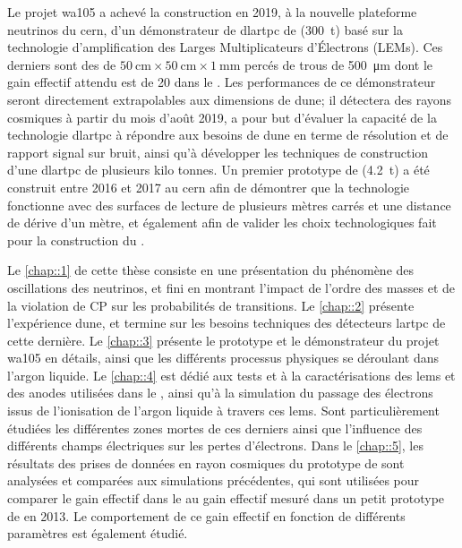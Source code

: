 Le projet \acrshort{wa105} a achevé la construction en 2019, à la nouvelle plateforme neutrinos du \acrshort{cern}, d'un démonstrateur de \gls{dlartpc} de \SSS{} (\SI{300}{\tonne}) basé sur la technologie d'amplification des Larges Multiplicateurs d’Électrons (LEMs). Ces derniers sont des  de $\SI{50}{\centi\meter}\times\SI{50}{\centi\meter}\times\SI{1}{\milli\meter}$ percés de trous de \SI{500}{\micro\meter} dont le gain effectif attendu est de 20 dans le \SSS{}. Les performances de ce démonstrateur seront directement extrapolables aux dimensions de \acrshort{dune}; il détectera des rayons cosmiques à partir du mois d'août 2019, a pour but d'évaluer la capacité de la technologie \gls{dlartpc} à répondre aux besoins de \acrshort{dune} en terme de résolution et de rapport signal sur bruit, ainsi qu'à développer les techniques de construction d'une \gls{dlartpc} de plusieurs kilo tonnes. Un premier prototype de \TOO{} (\SI{4.2}{\tonne}) a été construit entre 2016 et 2017 au \acrshort{cern} afin de démontrer que la technologie fonctionne avec des surfaces de lecture de plusieurs mètres carrés et une distance de dérive d'un mètre, et également afin de valider les choix technologiques fait pour la construction du \SSS{}.

Le \autoref{chap::1} de cette thèse consiste en une présentation du phénomène des oscillations des neutrinos, et fini en montrant l'impact de l'ordre des masses et de la violation de CP sur les probabilités de transitions. Le \autoref{chap::2} présente l'expérience \acrshort{dune}, et termine sur les besoins techniques des détecteurs \gls{lartpc} de cette dernière. Le \autoref{chap::3} présente le prototype et le démonstrateur du projet \acrshort{wa105} en détails, ainsi que les différents processus physiques se déroulant dans l'argon liquide. Le \autoref{chap::4} est dédié aux tests et à la caractérisations des \glspl{lem} et des anodes utilisées dans le \SSS{}, ainsi qu'à la simulation du passage des électrons issus de l'ionisation de l'argon liquide à travers ces \glspl{lem}. Sont particulièrement étudiées les différentes zones mortes de ces derniers ainsi que l'influence des différents champs électriques sur les pertes d'électrons.  Dans le \autoref{chap::5}, les résultats des prises de données en rayon cosmiques du prototype de \TOO{} sont analysées et comparées aux simulations précédentes, qui sont utilisées pour comparer le gain effectif dans le \TOO{} au gain effectif mesuré dans un petit prototype de \threeL{} en 2013. Le comportement de ce gain effectif en fonction de différents paramètres est également étudié.

